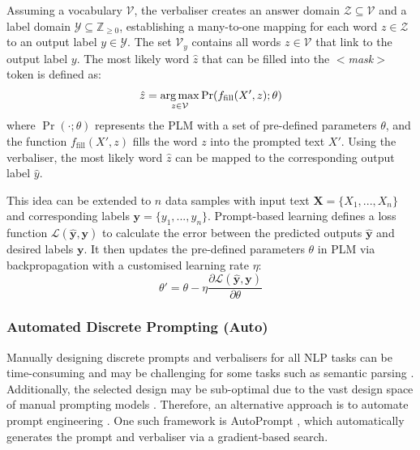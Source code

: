 Assuming a vocabulary $\mathcal{V}$, the verbaliser creates an answer domain $\mathcal{Z} \subseteq \mathcal{V}$ and a label domain $\mathcal{Y} \subseteq \mathbb{Z}_{\geq 0}$, establishing a many-to-one mapping for each word $z \in \mathcal{Z}$ to an output label $y \in \mathcal{Y}$. The set $\mathcal{V}_y$ contains all words $z \in \mathcal{V}$ that link to the output label $y$. The most likely word $\hat{z}$ that can be filled into the $<$\textit{mask}$>$ token is defined as: 
\begin{equation} 
\hat{z} = \operatorname*{arg\,max}_{z\in \mathcal{V}} \Pr(f_{\text{fill}}(X', z);\theta)
\end{equation}
where $\Pr(\cdot; \theta)$ represents the PLM with a set of pre-defined parameters $\theta$, and the function $f_{\text{fill}}(X', z)$ fills the word $z$ into the prompted text $X'$. Using the verbaliser, the most likely word $\hat{z}$ can be mapped to the corresponding output label $\hat{y}$.

This idea can be extended to $n$ data samples with input text $\mathbf{X} = \{X_1, ..., X_n\}$ and corresponding labels $\mathbf{y} = \{y_1, ..., y_n\}$. Prompt-based learning defines a loss function $\mathcal{L}(\hat{\mathbf{y}}, \mathbf{y})$ to calculate the error between the predicted outputs $\hat{\mathbf{y}}$ and desired labels $\mathbf{y}$. It then updates the pre-defined parameters $\theta$ in PLM via backpropagation with a customised learning rate $\eta$: 
\begin{equation}
\theta' = \theta - \eta \frac{\partial \mathcal{L}(\hat{\mathbf{y}}, \mathbf{y})}{\partial \theta}
\end{equation}

\subsubsection{Automated Discrete Prompting (Auto)}
Manually designing discrete prompts and verbalisers for all NLP tasks can be time-consuming and may be challenging for some tasks such as semantic parsing \cite{Shin21Auto}. Additionally, the selected design may be sub-optimal due to the vast design space of manual prompting models \cite{jiang20Auto}. Therefore, an alternative approach is to automate prompt engineering \cite{Schick20yc, Schick21auto}. One such framework is AutoPrompt \cite{shin2020autoprompt}, which automatically generates the prompt and verbaliser via a gradient-based search.

